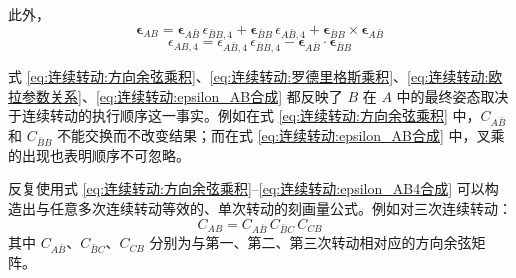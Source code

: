 此外，
\begin{equation}\label{eq:连续转动:epsilon_AB合成}
\boldsymbol{\epsilon}_{AB}=\boldsymbol{\epsilon}_{A\bar B}\,\epsilon_{\bar B B,4}+\boldsymbol{\epsilon}_{\bar B B}\,\epsilon_{A\bar B,4}+\boldsymbol{\epsilon}_{\bar B B}\times\boldsymbol{\epsilon}_{A\bar B}
\end{equation}
\begin{equation}\label{eq:连续转动:epsilon_AB4合成}
\epsilon_{AB,4}=\epsilon_{A\bar B,4}\,\epsilon_{\bar B B,4}-\boldsymbol{\epsilon}_{A\bar B}\cdot\boldsymbol{\epsilon}_{\bar B B}
\end{equation}

式 \eqref{eq:连续转动:方向余弦乘积}、\eqref{eq:连续转动:罗德里格斯乘积}、\eqref{eq:连续转动:欧拉参数关系}、\eqref{eq:连续转动:epsilon_AB合成} 都反映了 $B$ 在 $A$ 中的最终姿态取决于连续转动的执行顺序这一事实。例如在式 \eqref{eq:连续转动:方向余弦乘积} 中，$C_{A\bar B}$ 和 $C_{\bar B B}$ 不能交换而不改变结果；而在式 \eqref{eq:连续转动:epsilon_AB合成} 中，叉乘的出现也表明顺序不可忽略。

反复使用式 \eqref{eq:连续转动:方向余弦乘积}--\eqref{eq:连续转动:epsilon_AB4合成} 可以构造出与任意多次连续转动等效的、单次转动的刻画量公式。例如对三次连续转动：
$$
C_{AB}=C_{A\bar B}\,C_{\bar B C}\,C_{CB}
$$
其中 $C_{A\bar B}$、$C_{\bar B C}$、$C_{CB}$ 分别为与第一、第二、第三次转动相对应的方向余弦矩阵。

